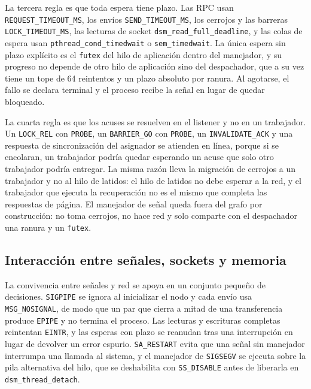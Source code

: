 La tercera regla es que toda espera tiene plazo. Las RPC usan \texttt{REQUEST\_TIMEOUT\_MS}, los envíos \texttt{SEND\_TIMEOUT\_MS}, los cerrojos y las barreras \texttt{LOCK\_TIMEOUT\_MS}, las lecturas de socket \texttt{dsm\_read\_full\_deadline}, y las colas de espera usan \texttt{pthread\_cond\_timedwait} o \texttt{sem\_timedwait}. La única espera sin plazo explícito es el \texttt{futex} del hilo de aplicación dentro del manejador, y su progreso no depende de otro hilo de aplicación sino del despachador, que a su vez tiene un tope de 64 reintentos y un plazo absoluto por ranura. Al agotarse, el fallo se declara terminal y el proceso recibe la señal en lugar de quedar bloqueado.

La cuarta regla es que los acuses se resuelven en el listener y no en un trabajador. Un \texttt{LOCK\_REL} con \texttt{PROBE}, un \texttt{BARRIER\_GO} con \texttt{PROBE}, un \texttt{INVALIDATE\_ACK} y una respuesta de sincronización del asignador se atienden en línea, porque si se encolaran, un trabajador podría quedar esperando un acuse que solo otro trabajador podría entregar. La misma razón lleva la migración de cerrojos a un trabajador y no al hilo de latidos: el hilo de latidos no debe esperar a la red, y el trabajador que ejecuta la recuperación no es el mismo que completa las respuestas de página. El manejador de señal queda fuera del grafo por construcción: no toma cerrojos, no hace red y solo comparte con el despachador una ranura y un \texttt{futex}.

\subsection{Interacción entre señales, sockets y memoria}

La convivencia entre señales y red se apoya en un conjunto pequeño de decisiones. \texttt{SIGPIPE} se ignora al inicializar el nodo y cada envío usa \texttt{MSG\_NOSIGNAL}, de modo que un par que cierra a mitad de una transferencia produce \texttt{EPIPE} y no termina el proceso. Las lecturas y escrituras completas reintentan \texttt{EINTR}, y las esperas con plazo se reanudan tras una interrupción en lugar de devolver un error espurio. \texttt{SA\_RESTART} evita que una señal sin manejador interrumpa una llamada al sistema, y el manejador de \texttt{SIGSEGV} se ejecuta sobre la pila alternativa del hilo, que se deshabilita con \texttt{SS\_DISABLE} antes de liberarla en \texttt{dsm\_thread\_detach}.


